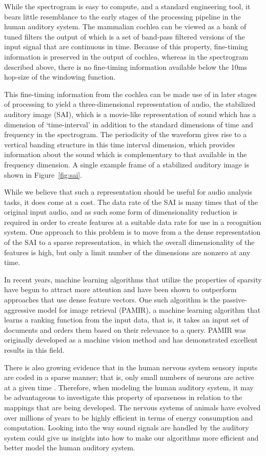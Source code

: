 \documentclass[12pt,oneside]{book}
\begin{document}
While the spectrogram is easy to compute, and a standard engineering
tool, it bears little resemblance to the early stages of the
processing pipeline in the human auditory system. The mammalian
cochlea can be viewed as a bank of tuned filters the output of which
is a set of band-pass filtered versions of the input signal that are
continuous in time. Because of this property, fine-timing information
is preserved in the output of cochlea, whereas in the spectrogram
described above, there is no fine-timing information available below
the 10ms hop-size of the windowing function.

This fine-timing information from the cochlea can be made use of in
later stages of processing to yield a three-dimensional representation
of audio, the stabilized auditory image (SAI)\cite{patterson2000},
which is a movie-like representation of sound which has a dimension of
`time-interval' in addition to the standard dimensions of time and
frequency in the spectrogram. The periodicity of the waveform gives
rise to a vertical banding structure in this time interval dimension,
which provides information about the sound which is complementary to
that available in the frequency dimension. A single example frame of a
stabilized auditory image is shown in Figure~\ref{fig:sai}.

While we believe that such a representation should be useful for audio
analysis tasks, it does come at a cost. The data rate of the SAI is
many times that of the original input audio, and as such some form of
dimensionality reduction is required in order to create features at a
suitable data rate for use in a recognition system. One approach to
this problem is to move from a the dense representation of the SAI to
a sparse representation, in which the overall dimensionality of the
features is high, but only a limit number of the dimensions are
nonzero at any time.

In recent years, machine learning algorithms that utilize the
properties of sparsity have begun to attract more attention and have
been shown to outperform approaches that use dense feature vectors.
One such algorithm is the passive-aggressive model for image retrieval
(PAMIR), a machine learning algorithm that learns a ranking function
from the input data, that is, it takes an input set of documents and
orders them based on their relevance to a query. PAMIR was originally
developed as a machine vision method and has demonstrated excellent
results in this field.

There is also growing evidence that in the human nervous system
sensory inputs are coded in a sparse manner; that is, only small
numbers of neurons are active at a given time \cite{olshausen2004}.
Therefore, when modeling the human auditory system, it may be
advantageous to investigate this property of sparseness in relation to
the mappings that are being developed. The nervous systems of animals
have evolved over millions of years to be highly efficient in terms of
energy consumption and computation.  Looking into the way sound
signals are handled by the auditory system could give us insights into
how to make our algorithms more efficient and better model the human
auditory system.
\end{document}
